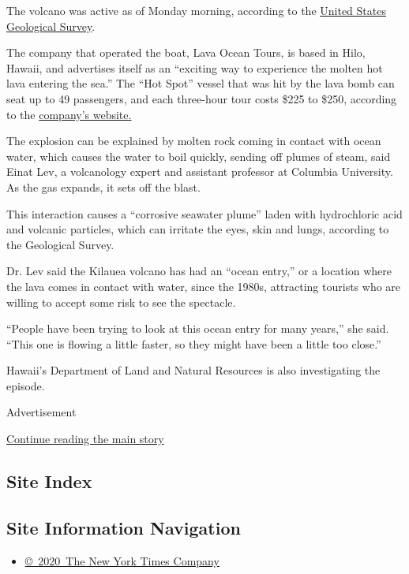 The volcano was active as of Monday morning, according to the
\href{https://volcanoes.usgs.gov/volcanoes/kilauea/status.html}{United
States Geological Survey}.

The company that operated the boat, Lava Ocean Tours, is based in Hilo,
Hawaii, and advertises itself as an ``exciting way to experience the
molten hot lava entering the sea.'' The ``Hot Spot'' vessel that was hit
by the lava bomb can seat up to 49 passengers, and each three-hour tour
costs \$225 to \$250, according to the
\href{http://seelava.com/big-island-boat-tours/}{company's website.}

The explosion can be explained by molten rock coming in contact with
ocean water, which causes the water to boil quickly, sending off plumes
of steam, said Einat Lev, a volcanology expert and assistant professor
at Columbia University. As the gas expands, it sets off the blast.

This interaction causes a ``corrosive seawater plume'' laden with
hydrochloric acid and volcanic particles, which can irritate the eyes,
skin and lungs, according to the Geological Survey.

Dr. Lev said the Kilauea volcano has had an ``ocean entry,'' or a
location where the lava comes in contact with water, since the 1980s,
attracting tourists who are willing to accept some risk to see the
spectacle.

``People have been trying to look at this ocean entry for many years,''
she said. ``This one is flowing a little faster, so they might have been
a little too close.''

Hawaii's Department of Land and Natural Resources is also investigating
the episode.

Advertisement

\protect\hyperlink{after-bottom}{Continue reading the main story}

\hypertarget{site-index}{%
\subsection{Site Index}\label{site-index}}

\hypertarget{site-information-navigation}{%
\subsection{Site Information
Navigation}\label{site-information-navigation}}

\begin{itemize}
\tightlist
\item
  \href{https://help.nytimes3xbfgragh.onion/hc/en-us/articles/115014792127-Copyright-notice}{©~2020~The
  New York Times Company}
\end{itemize}

